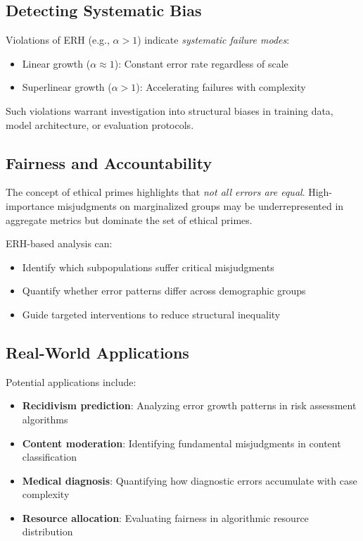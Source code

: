 \documentclass[12pt,a4paper]{article}
\theoremstyle{definition}
\theoremstyle{remark}
\begin{document}
\subsection{Detecting Systematic Bias}

Violations of ERH (e.g., $\alpha > 1$) indicate \emph{systematic failure modes}:
\begin{itemize}
    \item Linear growth ($\alpha \approx 1$): Constant error rate regardless of scale
    \item Superlinear growth ($\alpha > 1$): Accelerating failures with complexity
\end{itemize}

Such violations warrant investigation into structural biases in training data, model architecture, or evaluation protocols.

\subsection{Fairness and Accountability}

The concept of ethical primes highlights that \emph{not all errors are equal}. High-importance misjudgments on marginalized groups may be underrepresented in aggregate metrics but dominate the set of ethical primes.

ERH-based analysis can:
\begin{itemize}
    \item Identify which subpopulations suffer critical misjudgments
    \item Quantify whether error patterns differ across demographic groups
    \item Guide targeted interventions to reduce structural inequality
\end{itemize}

\subsection{Real-World Applications}

Potential applications include:
\begin{itemize}
    \item \textbf{Recidivism prediction}: Analyzing error growth patterns in risk assessment algorithms
    \item \textbf{Content moderation}: Identifying fundamental misjudgments in content classification
    \item \textbf{Medical diagnosis}: Quantifying how diagnostic errors accumulate with case complexity
    \item \textbf{Resource allocation}: Evaluating fairness in algorithmic resource distribution
\end{itemize}
\end{document}
